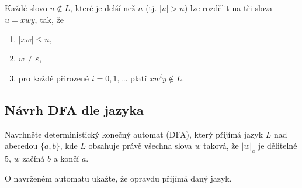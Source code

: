 Každé slovo $u \not\in L$, které je delší než $n$ (tj. $|u| > n$) lze rozdělit na tři slova $u =xwy$, tak, že
\begin{enumerate}[noitemsep]
    \item $|xw| \leq n,$
    \item $w \not= \varepsilon$,
    \item pro každé přirozené $i = 0, 1, ...$ platí $xw^iy \not\in L$.
\end{enumerate}

\subsection{Návrh DFA dle jazyka}
Navrhněte deterministický konečný automat (DFA), který přijímá jazyk $L$ nad abecedou $\{a,b\}$, kde $L$ obsahuje právě
všechna slova $w$ taková, že $|w|_a$ je dělitelné $5$, $w$ začíná $b$ a končí $a$.

\noindent
O navrženém automatu ukažte, že opravdu přijímá daný jazyk.


